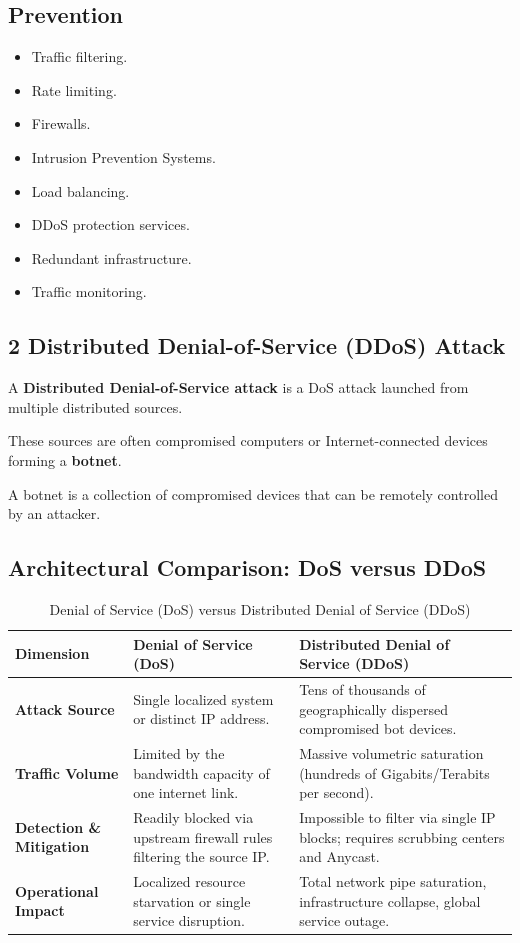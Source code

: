 \subsection{Prevention}

\begin{itemize}
\item Traffic filtering.
\item Rate limiting.
\item Firewalls.
\item Intrusion Prevention Systems.
\item Load balancing.
\item DDoS protection services.
\item Redundant infrastructure.
\item Traffic monitoring.
\end{itemize}

\subsection{2 Distributed Denial-of-Service (DDoS) Attack}

A \textbf{Distributed Denial-of-Service attack} is a DoS attack launched from multiple distributed sources.

These sources are often compromised computers or Internet-connected devices forming a \textbf{botnet}.

A botnet is a collection of compromised devices that can be remotely controlled by an attacker.

\subsection{Architectural Comparison: DoS versus DDoS}

\begin{table}[htbp]
\centering
\caption{Denial of Service (DoS) versus Distributed Denial of Service (DDoS)}
\label{tab:dos_vs_ddos}
\begin{tabularx}{\textwidth}{p{3.2cm} p{5.5cm} X}
\toprule
\textbf{Dimension} & \textbf{Denial of Service (DoS)} & \textbf{Distributed Denial of Service (DDoS)} \\
\midrule
\textbf{Attack Source} & Single localized system or distinct IP address. & Tens of thousands of geographically dispersed compromised bot devices. \\
\textbf{Traffic Volume} & Limited by the bandwidth capacity of one internet link. & Massive volumetric saturation (hundreds of Gigabits/Terabits per second). \\
\textbf{Detection \& Mitigation} & Readily blocked via upstream firewall rules filtering the source IP. & Impossible to filter via single IP blocks; requires scrubbing centers and Anycast. \\
\textbf{Operational Impact} & Localized resource starvation or single service disruption. & Total network pipe saturation, infrastructure collapse, global service outage. \\
\bottomrule
\end{tabularx}
\end{table}


